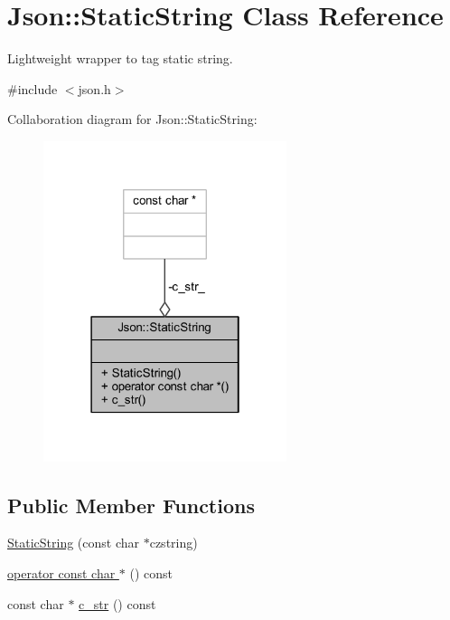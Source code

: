 \hypertarget{class_json_1_1_static_string}{}\section{Json\+:\+:Static\+String Class Reference}
\label{class_json_1_1_static_string}


Lightweight wrapper to tag static string.  




{\ttfamily \#include $<$json.\+h$>$}



Collaboration diagram for Json\+:\+:Static\+String\+:\nopagebreak
\begin{figure}[H]
\begin{center}
\leavevmode
\includegraphics[width=202pt]{class_json_1_1_static_string__coll__graph}
\end{center}
\end{figure}
\subsection*{Public Member Functions}
\begin{DoxyCompactItemize}
\item 
\hyperlink{class_json_1_1_static_string_afb6baf1ec078ce76f0b0f9b39d19437f}{Static\+String} (const char $\ast$czstring)
\item 
\hyperlink{class_json_1_1_static_string_a256a6cc0c630aef670848a0f11707b62}{operator const char $\ast$} () const
\item 
const char $\ast$ \hyperlink{class_json_1_1_static_string_ad6be703d432d108623bb0aa06b0b90ca}{c\+\_\+str} () const
\end{DoxyCompactItemize}
